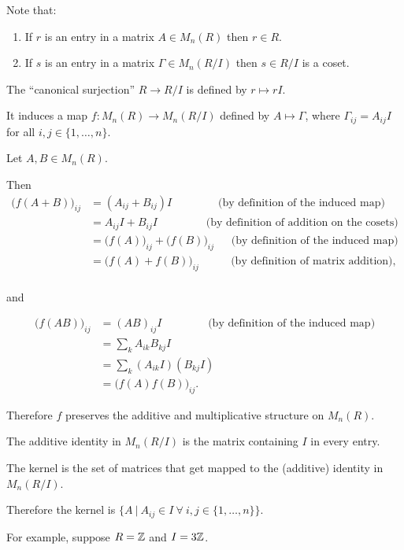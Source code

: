 Note that:
\begin{enumerate}
\item If $r$ is an entry in a matrix $A \in M_n(R)$ then $r \in R$.
\item If $s$ is an entry in a matrix $\Gamma \in M_n(R/I)$ then $s \in R/I$ is a coset.
\end{enumerate}

The ``canonical surjection'' $R \to R/I$ is defined by $r \mapsto rI$.

It induces a map $f:M_n(R) \to M_n(R/I)$ defined by $A \mapsto \Gamma$, where
$\Gamma_{ij} = A_{ij}I$ for all $i,j \in \{1, \ldots, n\}$.

Let $A, B \in M_n(R)$.

Then
\begin{align*}
  \Big(f(A + B)\Big)_{ij}
  &= (A_{ij} + B_{ij})I ~~~~~~~~~~~~~~~~~~~\text{(by definition of the induced map)}\\
  &= A_{ij}I + B_{ij}I ~~~~~~~~~~~~~~~~~~~~\text{(by definition of addition on the cosets)}\\
  &= \Big(f(A)\Big)_{ij} + \Big(f(B)\Big)_{ij} ~~~~~~~\text{(by definition of the induced map)}\\
  &= \Big(f(A) + f(B)\Big)_{ij}~~~~~~~~~~~~~\text{(by definition of matrix addition)},\\
\end{align*}

and

\begin{align*}
  \Big(f(AB)\Big)_{ij}
  &= (AB)_{ij}I ~~~~~~~~~~~~~~~~~~~\text{(by definition of the induced map)}\\
  &= \sum_k A_{ik}B_{kj}I\\
  &= \sum_k (A_{ik}I)(B_{kj}I)\\
  &= \Big(f(A)f(B)\Big)_{ij}.
\end{align*}

Therefore $f$ preserves the additive and multiplicative structure on $M_n(R)$.


The additive identity in $M_n(R/I)$ is the matrix containing $I$ in every entry.

The kernel is the set of matrices that get mapped to the (additive) identity in $M_n(R/I)$.

Therefore the kernel is $\{A ~|~ A_{ij} \in I ~\forall~ i, j \in \{1, \ldots, n\}\}$.

For example, suppose $R = \mathbb{Z}$ and $I = 3\mathbb{Z}$.

